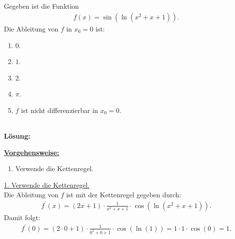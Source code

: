 \newpage
\subsection*{}
Gegeben ist die Funktion
\begin{align*}
	f(x) = \sin(\ln(x^2 + x + 1)).
\end{align*}
Die Ableitung von $f$ in $x_0 = 0 $ ist:
\renewcommand{\labelenumi}{(\alph{enumi})}
\begin{enumerate}
	\item 
	$ 0$.
	\item
	$ 1 $.
	\item
	$ 2 $.
	\item
	$ \pi $.
	\item
	$f$ ist nicht differenzierbar in $x_0 = 0$.
\end{enumerate}
\ \\
\textbf{Lösung:}
\begin{mdframed}
\underline{\textbf{Vorgehensweise:}}
\renewcommand{\labelenumi}{\theenumi.}
\begin{enumerate}
\item Verwende die Kettenregel.
\end{enumerate}
\end{mdframed}
\underline{1. Verwende die Kettenregel.}\\
Die Ableitung von $f$ ist mit der Kettenregel gegeben durch:
\begin{align*}
	f^\prime(x) = (2x +1) \cdot \frac{1}{x^2 +x +1 } \cdot  \cos (\ln(x^2 + x +1)).
\end{align*}
Damit folgt:
\begin{align*}
	f^\prime(0)  =(2\cdot 0 +1 ) \cdot \frac{1}{0^2 + 0 +1} \cdot \cos(\ln(1))
	= 1 \cdot 1 \cdot \cos(0) = 1.
\end{align*}

\newpage

